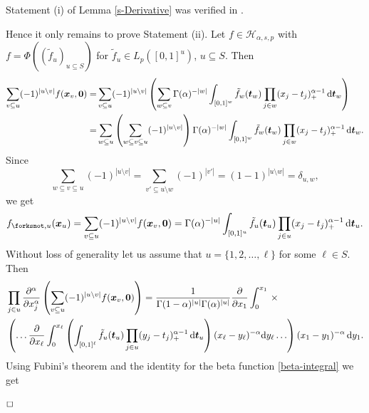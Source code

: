 \documentclass[12pt]{article}
\newenvironment{proof}{\begin{trivlist}
    \item[\hskip\labelsep{\it Proof.}]}{$\hfill\Box$\end{trivlist}}
\newcommand{\bsx}{\boldsymbol{x}}
\newcommand{\bst}{\boldsymbol{t}}
\newcommand{\bszero}{\boldsymbol{0}}
\newcommand{\HH}{\mathcal{H}}
\begin{document}
\begin{proof}
Statement (i) of Lemma \ref{s-Derivative} %
was verified in \cite[Prop.~1]{D08}.

Hence it only remains to prove Statement (ii). Let
$f\in \HH_{\alpha,s,p}$ with $f=\Phi((\tilde{f}_u)_{u\subseteq S})$
for $\tilde{f}_u \in L_p([0,1]^{u})$, $u\subseteq S$. Then
\begin{equation*}
\begin{split}
\sum_{v\subseteq u} (-1)^{|u\setminus v|} f(\bsx_v, \bszero) =&
\sum_{v\subseteq u} (-1)^{|u\setminus v|} \left( \sum_{w\subseteq v}
\Gamma(\alpha)^{-|w|} \int_{[0,1]^{w}} \tilde{f}_w(\bst_w)
\prod_{j\in w}(x_j-t_j)^{\alpha-1}_+ \,{\rm d} \bst_w \right)\\
=& \sum_{w\subseteq u} \left( \sum_{w\subseteq v \subseteq u}
(-1)^{|u\setminus v|} \right)
\Gamma(\alpha)^{-|w|} \int_{[0,1]^{w}} \tilde{f}_w(\bst_w)
\prod_{j\in w}(x_j-t_j)^{\alpha-1}_+ \,{\rm d} \bst_w.
\end{split}
\end{equation*}
Since
\begin{equation*}
\sum_{w\subseteq v \subseteq u} (-1)^{|u \setminus v|} =
\sum_{v'\subseteq u\setminus w} (-1)^{|v'|} = (1-1)^{|u\setminus w|}
= \delta_{u,w},
\end{equation*}
we get
\begin{equation}\label{anchored_decomp_2}
f_{\forksnot, u}(\bsx_u) = \sum_{v\subseteq u} (-1)^{|u\setminus v|} f(\bsx_v, \bszero) =
\Gamma(\alpha)^{-|u|} \int_{[0,1]^{u}} \tilde{f}_u(\bst_u)
\prod_{j\in u}(x_j-t_j)^{\alpha-1}_+ \,{\rm d} \bst_u.
\end{equation}
Without loss of generality let us assume that $u=\{1,2,\ldots,\ell\}$
for some $\ell \in S$.
Then
\begin{equation*}
\begin{split}
&\prod_{j\in u} \frac{\partial^{\alpha}}{\partial x^\alpha_j}
\left( \sum_{v\subseteq u} (-1)^{|u\setminus v|} f(\bsx_v,\bszero)
\right)
= \frac{1}{\Gamma(1-\alpha)^{|u|}\Gamma(\alpha)^{|u|}}
\frac{\partial}{\partial x_1} \int^{x_1}_0 \,\times\\
&\left(
\ldots \frac{\partial}{\partial x_\ell} \int^{x_\ell}_0
\left( \int_{[0,1]^\ell} \tilde{f}_u(\bst_u) \prod_{j\in u}
(y_j-t_j)^{\alpha-1}_+ \,{\rm d} \bst_u \right) 
(x_\ell - y_\ell )^{-\alpha}
{\rm d} y_\ell  \ldots \right) (x_1-y_1)^{-\alpha}
\,{\rm d}y_1.
\end{split}
\end{equation*}
Using Fubini's theorem and the identity for the beta function \eqref{beta-integral} we get

\end{proof}
\end{document}
